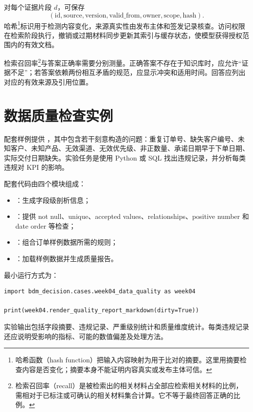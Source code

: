 对每个证据片段 \(d\)，可保存
\[
(\text{id},\text{source},\text{version},
\text{valid\_from},\text{owner},\text{scope},\text{hash}).
\]
哈希\footnote{哈希函数（hash function）把输入内容映射为用于比对的摘要。这里用摘要检查内容是否变化；摘要本身不能证明内容真实或发布主体可信。}标识用于检测内容变化，来源真实性由发布主体和签发记录核查。访问权限在检索阶段执行，撤销或过期材料同步更新其索引与缓存状态，使模型获得授权范围内的有效文档。

检索召回率\footnote{检索召回率（recall）是被检索出的相关材料占全部应检索相关材料的比例，需相对于已标注或可确认的相关材料集合计算。它不等于最终回答正确的比例。}与答案正确率需要分别测量。正确答案不存在于知识库时，应允许“证据不足”；若答案依赖两份相互矛盾的规范，应显示冲突和适用时间。回答应列出对应的有效来源及引用位置。

\section{数据质量检查实例}

配套样例提供 ，其中包含若干刻意构造的问题：重复订单号、缺失客户编号、未知客户、未知产品、无效渠道、无效优先级、非正数量、承诺日期早于下单日期、实际交付日期缺失。实验任务是使用 Python 或 SQL 找出违规记录，并分析每类违规对 KPI 的影响。

配套代码由四个模块组成：
\begin{itemize}
  \item {}：生成字段级剖析信息；
  \item {}：提供 not null、unique、accepted values、relationships、positive number 和 date order 等检查；
  \item {}：组合订单样例数据所需的规则；
  \item {}：加载样例数据并生成质量报告。
\end{itemize}

最小运行方式为：
\begin{lstlisting}[style=pythonstyle,caption={运行第4章数据质量案例}]
import bdm_decision.cases.week04_data_quality as week04

print(week04.render_quality_report_markdown(dirty=True))
\end{lstlisting}

实验输出包括字段摘要、违规记录、严重级别统计和质量维度统计。每类违规记录还应说明受影响的指标、可能的数值偏差及处理方法。

